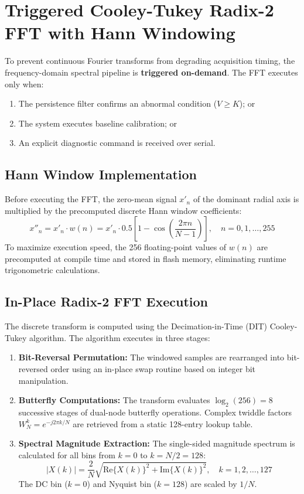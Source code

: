 \section{Triggered Cooley-Tukey Radix-2 FFT with Hann Windowing}
To prevent continuous Fourier transforms from degrading acquisition timing, the frequency-domain spectral pipeline is \textbf{triggered on-demand}. The FFT executes only when:
\begin{enumerate}
    \item The persistence filter confirms an abnormal condition ($V \ge K$); or
    \item The system executes baseline calibration; or
    \item An explicit diagnostic command is received over serial.
\end{enumerate}

\subsection{Hann Window Implementation}
Before executing the FFT, the zero-mean signal $x'_n$ of the dominant radial axis is multiplied by the precomputed discrete Hann window coefficients:
\begin{equation}
x''_n = x'_n \cdot w(n) = x'_n \cdot 0.5 \left[ 1 - \cos\left(\frac{2\pi n}{N - 1}\right) \right], \quad n = 0, 1, \dots, 255
\end{equation}
To maximize execution speed, the 256 floating-point values of $w(n)$ are precomputed at compile time and stored in flash memory, eliminating runtime trigonometric calculations.

\subsection{In-Place Radix-2 FFT Execution}
The discrete transform is computed using the Decimation-in-Time (DIT) Cooley-Tukey algorithm. The algorithm executes in three stages:
\begin{enumerate}
    \item \textbf{Bit-Reversal Permutation:} The windowed samples are rearranged into bit-reversed order using an in-place swap routine based on integer bit manipulation.
    \item \textbf{Butterfly Computations:} The transform evaluates $\log_2(256) = 8$ successive stages of dual-node butterfly operations. Complex twiddle factors $W_N^k = e^{-j 2\pi k / N}$ are retrieved from a static 128-entry lookup table.
    \item \textbf{Spectral Magnitude Extraction:} The single-sided magnitude spectrum is calculated for all bins from $k = 0$ to $k = N/2 = 128$:
    \begin{equation}
    |X(k)| = \frac{2}{N} \sqrt{\mathrm{Re}\{X(k)\}^2 + \mathrm{Im}\{X(k)\}^2}, \quad k = 1, 2, \dots, 127
    \end{equation}
    The DC bin ($k = 0$) and Nyquist bin ($k = 128$) are scaled by $1/N$.
\end{enumerate}

